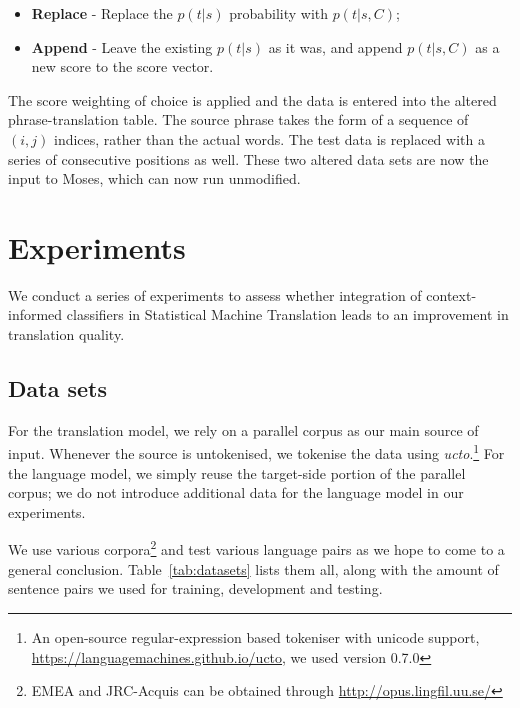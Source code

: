 \begin{itemize}
  \item \textbf{Replace} - Replace the $p(t|s)$ probability with $p(t|s,C)$;
  \item \textbf{Append} - Leave the existing $p(t|s)$ as it was, and append
    $p(t|s,C)$ as a new score to the score vector.
\end{itemize}

The score weighting of choice is applied and the data is entered into the
altered phrase-translation table. The source phrase takes the form of a
sequence of $(i,j)$ indices, rather than the actual words. The test data is
replaced with a series of consecutive positions as well. These two altered data
sets are now the input to Moses, which can now run unmodified.

\section{Experiments}
\label{sec:experiments}

We conduct a series of experiments to assess whether integration of
context-informed classifiers in Statistical Machine Translation leads to
an improvement in translation quality.


\subsection{Data sets}

For the translation model, we rely on a parallel corpus as our main source of
input. Whenever the source is untokenised, we tokenise the data using
\emph{ucto}.\footnote{An open-source regular-expression based tokeniser with
unicode support, \url{https://languagemachines.github.io/ucto}, we used version 0.7.0} For the language model, we
simply reuse the target-side portion of the parallel corpus; we do not
introduce additional data for the language model in our experiments.

We use various corpora\footnote{EMEA and JRC-Acquis can be obtained through
\url{http://opus.lingfil.uu.se/}} and test various language pairs as we hope to
come to a general conclusion. Table~\ref{tab:datasets} lists them all, along with the amount of
sentence pairs we used for training, development and testing.

